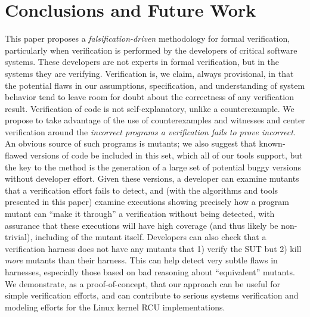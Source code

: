 \documentclass[conference]{IEEEtran}
\begin{document}

\section{Conclusions and Future Work}

This paper proposes a \emph{falsification-driven} methodology for
formal verification, particularly when verification is performed by
the developers of critical software systems.  These developers are not
experts in formal verification, but in the systems they are
verifying.  Verification is, we claim, always provisional, in that the
potential flaws in our assumptions, specification, and understanding
of system behavior tend to leave room for doubt about the correctness
of any verification result.  Verification of code is not
self-explanatory, unlike a counterexample.  We propose to take
advantage of the use of counterexamples and witnesses and center
verification around the \emph{incorrect programs a verification fails
  to prove incorrect}.  An obvious source of such programs is mutants;
we also suggest that known-flawed versions of code be included in this
set, which all of our tools support, but the key to the method is the
generation of a large set of potential buggy versions without
developer effort.  Given these versions, a developer can examine
mutants that a verification effort fails to detect, and (with the
algorithms and tools presented in this paper) examine executions showing
precisely how a program mutant can ``make it through'' a verification
without being detected, with assurance that these executions will have
high coverage (and thus likely be non-trivial), including of the
mutant itself.  Developers can also check that a verification harness
does not have any mutants that 1) verify the SUT but 2) kill
\emph{more} mutants than their harness.  This can help detect very
subtle flaws in harnesses, especially those based on bad reasoning
about ``equivalent'' mutants.  We demonstrate, as a proof-of-concept,
that our approach can be useful for simple verification efforts, and
can contribute to serious systems verification and modeling efforts for the Linux
kernel RCU implementations.
\end{document}
